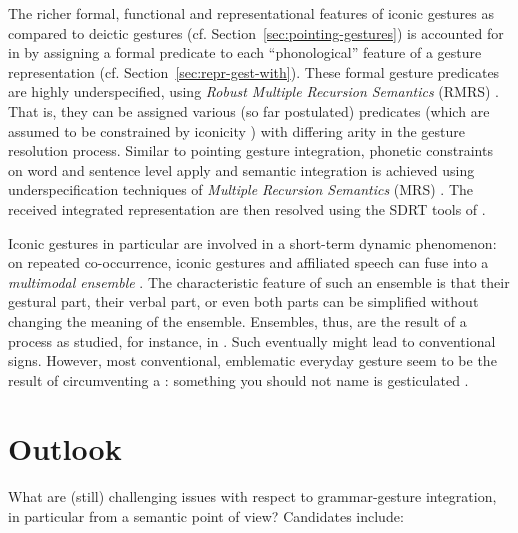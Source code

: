 \documentclass[output=paper]{langsci/langscibook}
\begin{document}
The richer formal, functional and representational features of iconic gestures as compared to deictic gestures (cf. Section~\ref{sec:pointing-gestures}) is accounted for in \citet{Alahverdzhieva:Lascarides:2010} by assigning a formal predicate to each \enquote{phonological} feature of a gesture representation (cf. Section~\ref{sec:repr-gest-with}). 
%
These formal gesture predicates are highly underspecified, using \textit{Robust Multiple Recursion Semantics} (RMRS) \citep{Copestake:2007}.
%
That is, they can be assigned various (so far postulated) predicates (which are assumed to be constrained by iconicity \citep{Alahverdzhieva:Lascarides:2010}) with differing arity in the gesture resolution process.
%
Similar to pointing gesture integration, phonetic constraints on word and sentence level apply and semantic integration is achieved using underspecification techniques of \textit{Multiple Recursion Semantics} (MRS) \citep{Copestake:Flickinger:Pollard:Sag:2005}.
%
The received integrated representation are then resolved using the SDRT tools of \citet{Lascarides:Stone:2009:a}.



Iconic gestures in particular are involved in a short-term dynamic phenomenon:
%
on repeated co-occurrence, iconic gestures and affiliated speech can fuse into a \emph{multimodal ensemble} \citep{Kendon:2004,Luecking:Mehler:Menke:2008,Mehler:Luecking:2012:d}.  
%
The characteristic feature of such an ensemble is that their gestural part, their verbal part, or even both parts can be simplified without changing the meaning of the ensemble.
%
Ensembles, thus, are the result of a process  as studied, for instance, in  \citet{Galantucci:Garrod:2011}.
%
Such  eventually might lead to conventional signs.
%
However, most conventional, emblematic everyday gesture seem to be the result of circumventing a : something you should not name is gesticulated \citep{Posner:2002}. 
 



\section{Outlook}
\label{sec:outlook}

What are (still) challenging issues with respect to grammar-gesture integration, in particular from a semantic point of view? Candidates include:
\end{document}
